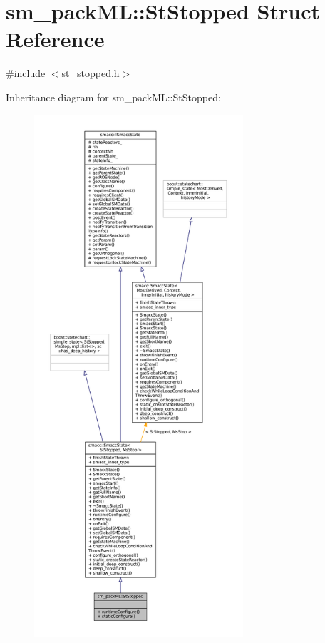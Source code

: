 \hypertarget{structsm__packML_1_1StStopped}{}\section{sm\+\_\+pack\+ML\+:\+:St\+Stopped Struct Reference}
\label{structsm__packML_1_1StStopped}


{\ttfamily \#include $<$st\+\_\+stopped.\+h$>$}



Inheritance diagram for sm\+\_\+pack\+ML\+:\+:St\+Stopped\+:
\nopagebreak
\begin{figure}[H]
\begin{center}
\leavevmode
\includegraphics[height=550pt]{structsm__packML_1_1StStopped__inherit__graph}
\end{center}
\end{figure}


